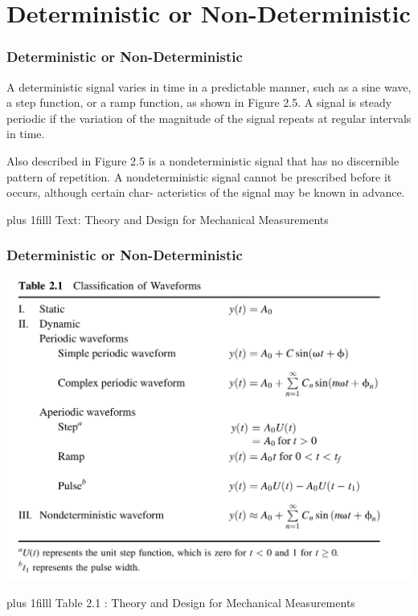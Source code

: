 \documentclass[fleqn]{beamer} %
\newcommand{\sectiontitleIV}{Deterministic or Non-Deterministic}
\newcommand{\btVFill}{\vskip0pt plus 1filll}
\begin{document}
\section{\sectiontitleIV}	
\begin{frame}[label=sectionIV] \small
\frametitle{\sectiontitleIV}
\bigskip

A deterministic signal varies in time in a predictable
manner, such as a sine wave, a step function, or a ramp function, as shown in Figure 2.5. A signal is
steady periodic if the variation of the magnitude of the signal repeats at regular intervals in time.

Also described in Figure 2.5 is a nondeterministic signal that has no discernible pattern of
repetition. A nondeterministic signal cannot be prescribed before it occurs, although certain char-
acteristics of the signal may be known in advance.

\btVFill
\tiny{Text: Theory and Design for Mechanical Measurements}	
\end{frame}

\begin{frame}[label=sectionIV] \small
\frametitle{\sectiontitleIV}
\bigskip

\includegraphics[scale=.15]{table_2_1.png}

\btVFill
\tiny{Table 2.1 : Theory and Design for Mechanical Measurements}	
\end{frame}
\end{document}
